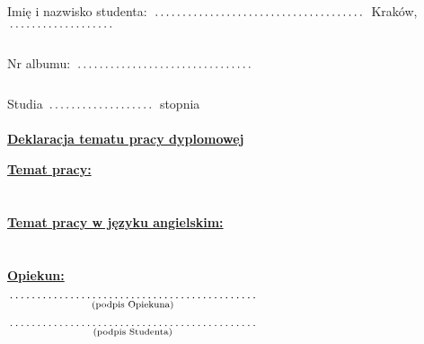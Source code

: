 \documentclass[a4paper,12pt]{article}
\newcommand{\fillField}[2]{
    $\underset{\text{#1}}{\parbox[t]{#2}{\dotfill}}$
}
\begin{document}
\noindent
Imię i nazwisko studenta: \fillField{}{6cm} \hfill Kraków, \fillField{}{3cm}\\\\
Nr albumu:\fillField{}{5cm} \\\\
Studia \fillField{}{3cm} stopnia\\


\vskip 2.0cm

\begin{center}
{\Large \underline{\textbf{Deklaracja tematu pracy dyplomowej}}}
\end{center}

\vskip 0.5cm

\noindent
\underline{\textbf{Temat pracy:}} \dotfill\\

\noindent
\null \dotfill \\\\
\underline{\textbf{Temat pracy w języku angielskim:}} \dotfill\\

\noindent
\null \dotfill \\\\
\underline{\textbf{Opiekun:}} \dotfill \\

\vskip 4.0cm

\null\hfill\fillField{(podpis Opiekuna)}{7cm}%

\vskip 2.0cm

\null\hfill\fillField{(podpis Studenta)}{7cm}%

\vskip 4.0cm
\end{document}
